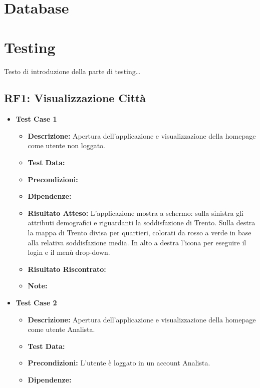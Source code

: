 \section{Database}

\section{Testing}

Testo di introduzione della parte di testing\dots

    \subsection{RF1: Visualizzazione Città}
        \begin{itemize}
            \item \textbf{Test Case 1}
                \begin{itemize}
                    \item \textbf{Descrizione:} Apertura dell'applicazione e visualizzazione della homepage come utente non loggato.
                    \item \textbf{Test Data:}
                    \item \textbf{Precondizioni:} 
                    \item \textbf{Dipendenze:}
                    \item \textbf{Risultato Atteso:} L'applicazione mostra a schermo: sulla sinistra gli attributi demografici e riguardanti la soddisfazione di Trento. Sulla destra la mappa di Trento divisa per quartieri, colorati da rosso a verde in base alla relativa soddisfazione media. In alto a destra l'icona per eseguire il login e il menù drop-down.
                    \item \textbf{Risultato Riscontrato:}
                    \item \textbf{Note:}
                \end{itemize}
            \item \textbf{Test Case 2}
                \begin{itemize}
                    \item \textbf{Descrizione:} Apertura dell'applicazione e visualizzazione della homepage come utente Analista.
                    \item \textbf{Test Data:}
                    \item \textbf{Precondizioni:} L'utente è loggato in un account Analista.
                    \item \textbf{Dipendenze:}

\end{itemize}
\end{itemize}
